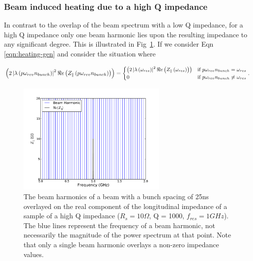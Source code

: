 \subsubsection{Beam induced heating due to a high Q impedance}

In contrast to the overlap of the beam spectrum with a low Q impedance, for a high Q impedance only one beam harmonic lies upon the resulting impedance to any significant degree. This is illustrated in Fig~\ref{fig:high_q_harmonics}. If we consider Eqn \ref{eqn:heating-gen} and consider the situation where

\begin{equation}
\begin{small}
\left( 2 \left| \lambda \left(p \omega_{rev}n_{bunch} \right)  \right|^{2}  \Re{}e \left( Z_{\parallel} \left(p \omega_{rev}n_{bunch}\right) \right) \right) = 
\begin{cases}
\left( 2 \left| \lambda \left( \omega_{res} \right)  \right|^{2}  \Re{}e \left( Z_{\parallel} \left( \omega_{res} \right) \right) \right) &\textrm{if $p \omega_{rev} n_{bunch} = \omega_{res}$}\\
0								&\textrm{if $p \omega_{rev} n_{bunch} \neq \omega_{res}$}
\end{cases}
\end{small}
\label{eqn:single_harmonic_profile}.
\end{equation}

\begin{figure}
\begin{center}
\includegraphics[width=0.65\textwidth]{Wakefields_and_Impedances/figures/high_q_1000_resonance_beam_harmonics.pdf}
\end{center}
\caption{The beam harmonics of a beam with a bunch spacing of 25ns overlayed on the real component of the longitudinal impedance of a sample of a high Q impedance ($R_{s}=10\Omega$, Q = 1000, $f_{res}=1GHz$). The blue lines represent the frequency of a beam harmonic, not necessarily the magnitude of the power spectrum at that point. Note that only a single beam harmonic overlays a non-zero impedance values.}
\label{fig:high_q_harmonics}
\end{figure}


